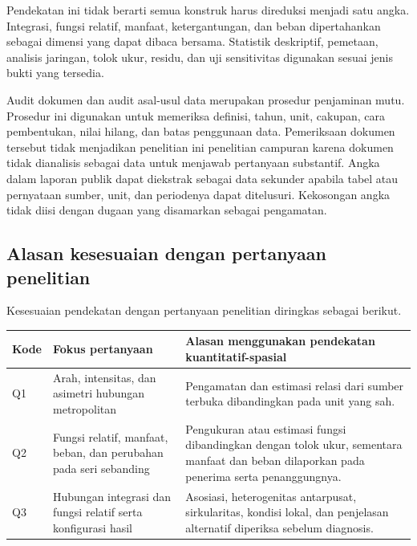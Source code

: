 \documentclass[11pt,a4paper,oneside,openany,indonesian]{report}
\begin{document}
Pendekatan ini tidak berarti semua konstruk harus direduksi menjadi satu
angka. Integrasi, fungsi relatif, manfaat, ketergantungan, dan beban
dipertahankan sebagai dimensi yang dapat dibaca bersama. Statistik
deskriptif, pemetaan, analisis jaringan, tolok ukur, residu, dan uji
sensitivitas digunakan sesuai jenis bukti yang tersedia.

Audit dokumen dan audit asal-usul data merupakan prosedur penjaminan
mutu. Prosedur ini digunakan untuk memeriksa definisi, tahun, unit,
cakupan, cara pembentukan, nilai hilang, dan batas penggunaan data.
Pemeriksaan dokumen tersebut tidak menjadikan penelitian ini penelitian
campuran karena dokumen tidak dianalisis sebagai data untuk menjawab
pertanyaan substantif. Angka dalam laporan publik dapat diekstrak sebagai
data sekunder apabila tabel atau pernyataan sumber, unit, dan periodenya
dapat ditelusuri. Kekosongan angka tidak diisi dengan dugaan yang
disamarkan sebagai pengamatan.

\subsection{Alasan kesesuaian dengan pertanyaan
penelitian}\label{alasan-kesesuaian-dengan-pertanyaan-penelitian}

Kesesuaian pendekatan dengan pertanyaan penelitian diringkas sebagai
berikut.

{\def\LTcaptype{none} %
\begin{longtable}[]{@{}
  >{\raggedright\arraybackslash}p{}
  >{\raggedright\arraybackslash}p{}
  >{\raggedright\arraybackslash}p{}@{}}
\toprule\noalign{}
\begin{minipage}[b]{\linewidth}\raggedright
Kode
\end{minipage} & \begin{minipage}[b]{\linewidth}\raggedright
Fokus pertanyaan
\end{minipage} & \begin{minipage}[b]{\linewidth}\raggedright
Alasan menggunakan pendekatan kuantitatif-spasial
\end{minipage} \\
\midrule\noalign{}
\endhead
\bottomrule\noalign{}
\endlastfoot
Q1 & Arah, intensitas, dan asimetri hubungan metropolitan & Pengamatan
dan estimasi relasi dari sumber terbuka dibandingkan pada unit yang
sah. \\
Q2 & Fungsi relatif, manfaat, beban, dan perubahan pada seri sebanding &
Pengukuran atau estimasi fungsi dibandingkan dengan tolok ukur, sementara
manfaat dan beban dilaporkan pada penerima serta penanggungnya. \\
Q3 & Hubungan integrasi dan fungsi relatif serta konfigurasi hasil &
Asosiasi, heterogenitas antarpusat, sirkularitas, kondisi lokal, dan
penjelasan alternatif diperiksa sebelum diagnosis. \\
\end{longtable}
}
\end{document}
